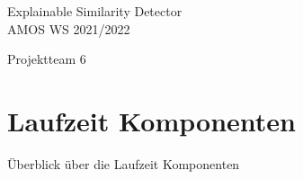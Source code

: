 
\clearmainofpairofpagestyles


\begin{center}
    \vspace*{2cm}
    \Huge{Explainable Similarity Detector}\\

    \vspace*{0.3cm}
    \huge{AMOS WS 2021/2022}

    \vspace*{1.5cm}
    \large{Projektteam 6}

    \vspace*{0.5cm}
    \normalfont{\todayGer}
\end{center}

\vspace*{\fill}

\renewcommand{\contentsname}{Inhaltsverzeichnis}
\tableofcontents

\vspace*{0.5cm}

\renewcommand{\listfigurename}{Abbildungsverzeichnis}
\listoffigures

\vspace*{\fill}

\newpage



\cfoot[]{\pagemark}
\ofoot{\todayGer}

\section{Laufzeit Komponenten}


Überblick über die Laufzeit Komponenten

\vspace*{\fill}

